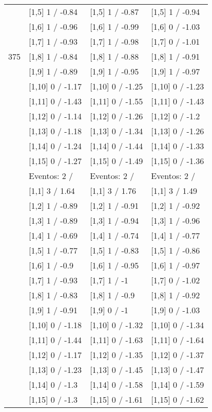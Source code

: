 \begin{table}
\begin{tabular}[t]{llll}
 & {}[1,5] 1  / -0.84 & {}[1,5] 1  / -0.87 & {}[1,5] 1  / -0.94\\
 & {}[1,6] 1  / -0.96 & {}[1,6] 1  / -0.99 & {}[1,6] 0  / -1.03\\
 & {}[1,7] 1  / -0.93 & {}[1,7] 1  / -0.98 & {}[1,7] 0  / -1.01\\
375 & {}[1,8] 1  / -0.84 & {}[1,8] 1  / -0.88 & {}[1,8] 1  / -0.91\\
\addlinespace
 & {}[1,9] 1  / -0.89 & {}[1,9] 1  / -0.95 & {}[1,9] 1  / -0.97\\
 & {}[1,10] 0  / -1.17 & {}[1,10] 0  / -1.25 & {}[1,10] 0  / -1.23\\
 & {}[1,11] 0  / -1.43 & {}[1,11] 0  / -1.55 & {}[1,11] 0  / -1.43\\
 & {}[1,12] 0  / -1.14 & {}[1,12] 0  / -1.26 & {}[1,12] 0  / -1.2\\
 & {}[1,13] 0  / -1.18 & {}[1,13] 0  / -1.34 & {}[1,13] 0  / -1.26\\
\addlinespace
 & {}[1,14] 0  / -1.24 & {}[1,14] 0  / -1.44 & {}[1,14] 0  / -1.33\\
 & {}[1,15] 0  / -1.27 & {}[1,15] 0  / -1.49 & {}[1,15] 0  / -1.36\\
 & Eventos:  2 / & Eventos:  2 / & Eventos:  2 /\\
 & {}[1,1] 3  / 1.64 & {}[1,1] 3  / 1.76 & {}[1,1] 3  / 1.49\\
 & {}[1,2] 1  / -0.89 & {}[1,2] 1  / -0.91 & {}[1,2] 1  / -0.92\\
\addlinespace
 & {}[1,3] 1  / -0.89 & {}[1,3] 1  / -0.94 & {}[1,3] 1  / -0.96\\
 & {}[1,4] 1  / -0.69 & {}[1,4] 1  / -0.74 & {}[1,4] 1  / -0.77\\
 & {}[1,5] 1  / -0.77 & {}[1,5] 1  / -0.83 & {}[1,5] 1  / -0.86\\
 & {}[1,6] 1  / -0.9 & {}[1,6] 1  / -0.95 & {}[1,6] 1  / -0.97\\
 & {}[1,7] 1  / -0.93 & {}[1,7] 1  / -1 & {}[1,7] 0  / -1.02\\
\addlinespace
500 & {}[1,8] 1  / -0.83 & {}[1,8] 1  / -0.9 & {}[1,8] 1  / -0.92\\
 & {}[1,9] 1  / -0.91 & {}[1,9] 0  / -1 & {}[1,9] 0  / -1.03\\
 & {}[1,10] 0  / -1.18 & {}[1,10] 0  / -1.32 & {}[1,10] 0  / -1.34\\
 & {}[1,11] 0  / -1.44 & {}[1,11] 0  / -1.63 & {}[1,11] 0  / -1.64\\
 & {}[1,12] 0  / -1.17 & {}[1,12] 0  / -1.35 & {}[1,12] 0  / -1.37\\
\addlinespace
 & {}[1,13] 0  / -1.23 & {}[1,13] 0  / -1.45 & {}[1,13] 0  / -1.47\\
 & {}[1,14] 0  / -1.3 & {}[1,14] 0  / -1.58 & {}[1,14] 0  / -1.59\\
 & {}[1,15] 0  / -1.3 & {}[1,15] 0  / -1.61 & {}[1,15] 0  / -1.62\\
\bottomrule
\end{tabular}
\end{table}
